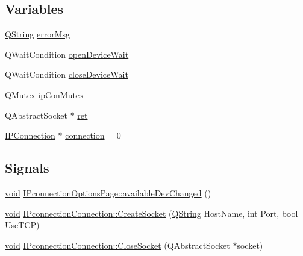 \subsection*{\-Variables}
\begin{DoxyCompactItemize}
\item 
\hyperlink{group___u_a_v_objects_plugin_gab9d252f49c333c94a72f97ce3105a32d}{\-Q\-String} \hyperlink{group___i_p_conn_plugin_ga2146099b9930944186a7ecc208950d22}{error\-Msg}
\item 
\-Q\-Wait\-Condition \hyperlink{group___i_p_conn_plugin_ga1724de889bbf979017a390aae2554bbd}{open\-Device\-Wait}
\item 
\-Q\-Wait\-Condition \hyperlink{group___i_p_conn_plugin_gaaa3820e584b5def7970dfed0b248a6f1}{close\-Device\-Wait}
\item 
\-Q\-Mutex \hyperlink{group___i_p_conn_plugin_gae78cf6a3d1073c22be5cc8054ae1e8d6}{ip\-Con\-Mutex}
\item 
\-Q\-Abstract\-Socket $\ast$ \hyperlink{group___i_p_conn_plugin_gabc99fe6afec1a75ccff1092e47375a40}{ret}
\item 
\hyperlink{class_i_p_connection}{\-I\-P\-Connection} $\ast$ \hyperlink{group___i_p_conn_plugin_ga75cb9b33b52928c030806876f2c2f439}{connection} = 0
\end{DoxyCompactItemize}
\subsection*{\-Signals}
\begin{DoxyCompactItemize}
\item 
\hyperlink{group___u_a_v_objects_plugin_ga444cf2ff3f0ecbe028adce838d373f5c}{void} \hyperlink{group___i_p_conn_plugin_ga1fa25251ff83374c3d8c41d161406b3a}{\-I\-Pconnection\-Options\-Page\-::available\-Dev\-Changed} ()
\item 
\hyperlink{group___u_a_v_objects_plugin_ga444cf2ff3f0ecbe028adce838d373f5c}{void} \hyperlink{group___i_p_conn_plugin_gae512a545bf7714b3a085d0a9ffec49e5}{\-I\-Pconnection\-Connection\-::\-Create\-Socket} (\hyperlink{group___u_a_v_objects_plugin_gab9d252f49c333c94a72f97ce3105a32d}{\-Q\-String} \-Host\-Name, int \-Port, bool \-Use\-T\-C\-P)
\item 
\hyperlink{group___u_a_v_objects_plugin_ga444cf2ff3f0ecbe028adce838d373f5c}{void} \hyperlink{group___i_p_conn_plugin_ga382e928a679913b5d226abbd10a08167}{\-I\-Pconnection\-Connection\-::\-Close\-Socket} (\-Q\-Abstract\-Socket $\ast$socket)
\end{DoxyCompactItemize}
